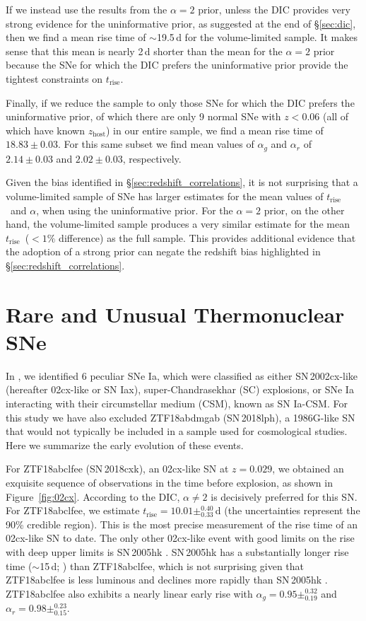 \documentclass[twocolumn]{aastex63}
\newcommand{\trise}{$t_\mathrm{rise}$}
\begin{document}
If we instead use the results from the $\alpha = 2$ prior, unless the DIC
provides very strong evidence for the uninformative prior, as suggested at the
end of \S\ref{sec:dic}, then we find a mean rise time of $\sim$19.5\,d for the
volume-limited sample. It makes sense that this mean is nearly 2\,d shorter
than the mean for the $\alpha=2$ prior because the SNe for which the DIC
prefers the uninformative prior provide the tightest constraints on \trise.

Finally, if we reduce the sample to only those SNe for which the DIC prefers
the uninformative prior, of which there are only 9 normal SNe with $z < 0.06$
(all of which have known $z_\mathrm{host}$) in our entire sample, we find a
mean rise time of $18.83 \pm 0.03$. For this same subset we find mean values
of $\alpha_g$ and $\alpha_r$ of $2.14 \pm 0.03$ and $2.02 \pm 0.03$,
respectively.

Given the bias identified in \S\ref{sec:redshift_correlations}, it is not
surprising that a volume-limited sample of SNe has larger estimates for the
mean values of \trise\ and $\alpha$, when using the uninformative prior. For
the $\alpha = 2$ prior, on the other hand, the volume-limited sample produces
a very similar estimate for the mean \trise\ ($< 1\%$ difference) as the full
sample. This provides additional evidence that the adoption of a strong prior
can negate the redshift bias highlighted in \S\ref{sec:redshift_correlations}.

\section{Rare and Unusual Thermonuclear SNe}\label{sec:rare}

In \citet{Yao19}, we identified 6 peculiar SNe Ia, which were classified as
either SN\,2002cx-like (hereafter 02cx-like or SN Iax), super-Chandrasekhar
(SC) explosions, or SNe Ia interacting with their circumstellar medium (CSM),
known as SN Ia-CSM. For this study we have also excluded ZTF18abdmgab
(SN\,2018lph), a 1986G-like SN that would not typically be included in a
sample used for cosmological studies. Here we summarize the early evolution of
these events.

For ZTF18abclfee (SN\,2018cxk), an 02cx-like SN at $z = 0.029$, we obtained an
exquisite sequence of observations in the time before explosion, as shown in
Figure~\ref{fig:02cx}. According to the DIC, $\alpha \ne 2$ is decisively
preferred for this SN. For ZTF18abclfee, we estimate \trise$ = 10.01
\pm^{0.40}_{0.33}$\,d (the uncertainties represent the 90\% credible region).
This is the most precise measurement of the rise time of an 02cx-like SN to
date. The only other 02cx-like event with good limits on the rise with deep
upper limits is SN\,2005hk \citep{Phillips07}. SN\,2005hk has a substantially
longer rise time ($\sim$15\,d; \citealt{Phillips07}) than ZTF18abclfee, which
is not surprising given that ZTF18abclfee is less luminous and declines more
rapidly than SN\,2005hk \citep{Miller17a,Yao19}. ZTF18abclfee also exhibits a
nearly linear early rise with $\alpha_g = 0.95 \pm^{0.32}_{0.19}$ and
$\alpha_r = 0.98 \pm^{0.23}_{0.15}$.
\end{document}
